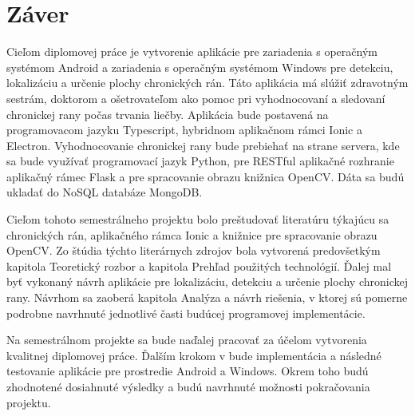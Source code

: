 \chapter{Záver}
Cieľom diplomovej práce je vytvorenie aplikácie pre zariadenia s operačným systémom Android a zariadenia s operačným systémom Windows pre detekciu, lokalizáciu a určenie plochy chronických rán. Táto aplikácia má slúžiť zdravotným sestrám, doktorom a ošetrovateľom ako pomoc pri vyhodnocovaní a sledovaní chronickej rany počas trvania liečby. Aplikácia bude postavená na programovacom jazyku Typescript, hybridnom aplikačnom rámci Ionic a Electron. Vyhodnocovanie chronickej rany bude prebiehať na strane servera, kde sa bude využívať programovací jazyk Python, pre RESTful aplikačné rozhranie aplikačný rámec Flask a pre spracovanie obrazu knižnica OpenCV. Dáta sa budú ukladať do NoSQL databáze MongoDB.

Cieľom tohoto semestrálneho projektu bolo preštudovať literatúru týkajúcu sa chronických rán, aplikačného rámca Ionic a knižnice pre spracovanie obrazu OpenCV. Zo štúdia týchto literárnych zdrojov bola vytvorená predovšetkým kapitola Teoretický rozbor a kapitola Prehľad použitých technológií. Ďalej mal byť vykonaný návrh aplikácie pre lokalizáciu, detekciu a určenie plochy chronickej rany. Návrhom sa zaoberá kapitola Analýza a návrh riešenia, v ktorej sú pomerne podrobne navrhnuté jednotlivé časti budúcej programovej implementácie. 

Na semestrálnom projekte sa bude naďalej pracovať za účelom vytvorenia kvalitnej diplomovej práce. Ďalším krokom v bude implementácia a následné testovanie aplikácie pre prostredie Android a Windows. Okrem toho budú zhodnotené dosiahnuté výsledky a budú navrhnuté možnosti pokračovania projektu.